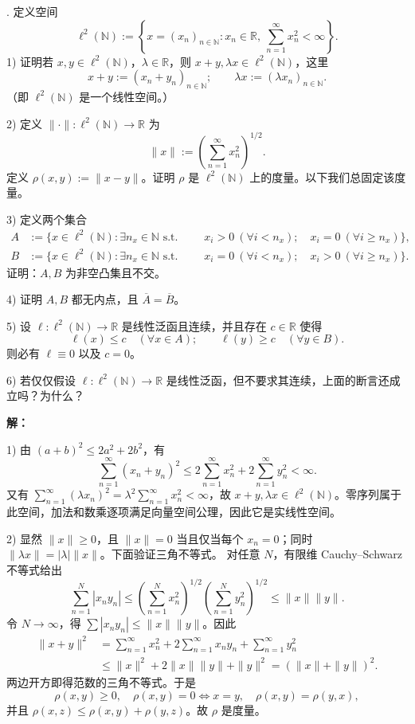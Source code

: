 \documentclass{article}
\begin{document}
\medskip
{}. 定义空间
\[
\ell^2(\mathbb N):=\left\{x=(x_n)_{n\in\mathbb N}:x_n\in\mathbb R,\ \sum_{n=1}^{\infty}x_n^2<\infty\right\}.
\]
1) 证明若 $x,y\in\ell^2(\mathbb N)$，$\lambda\in\mathbb R$，则 $x+y,\lambda x\in\ell^2(\mathbb N)$，这里
\[
x+y:=(x_n+y_n)_{n\in\mathbb N};\qquad
\lambda x:=(\lambda x_n)_{n\in\mathbb N}.
\]
（即 $\ell^2(\mathbb N)$ 是一个线性空间。）

2) 定义 $\|\cdot\|:\ell^2(\mathbb N)\to\mathbb R$ 为
\[
\|x\|:=\left(\sum_{n=1}^{\infty}x_n^2\right)^{1/2}.
\]
定义 $\rho(x,y):=\|x-y\|$。证明 $\rho$ 是 $\ell^2(\mathbb N)$ 上的度量。以下我们总固定该度量。

3) 定义两个集合
\[
\begin{aligned}
A&:=\{x\in\ell^2(\mathbb N):\exists n_x\in\mathbb N\text{ s.t. }\
&\quad x_i>0\ (\forall i<n_x);\quad x_i=0\ (\forall i\ge n_x)\},\\
B&:=\{x\in\ell^2(\mathbb N):\exists n_x\in\mathbb N\text{ s.t. }\
&\quad x_i=0\ (\forall i<n_x);\quad x_i>0\ (\forall i\ge n_x)\}.
\end{aligned}
\]
证明：$A,B$ 为非空凸集且不交。

4) 证明 $A,B$ 都无内点，且 $\overline A=\overline B$。

5) 设 $\ell:\ell^2(\mathbb N)\to\mathbb R$ 是线性泛函且连续，并且存在 $c\in\mathbb R$ 使得
\[
\ell(x)\le c\quad(\forall x\in A);\qquad
\ell(y)\ge c\quad(\forall y\in B).
\]
则必有 $\ell\equiv0$ 以及 $c=0$。

6) 若仅仅假设 $\ell:\ell^2(\mathbb N)\to\mathbb R$ 是线性泛函，但不要求其连续，上面的断言还成立吗？为什么？

\textbf{解：}



1) 由 $(a+b)^2\le2a^2+2b^2$，有
\[
\sum_{n=1}^{\infty}(x_n+y_n)^2
\le2\sum_{n=1}^{\infty}x_n^2+2\sum_{n=1}^{\infty}y_n^2<\infty.
\]
又有 $\sum_{n=1}^{\infty}(\lambda x_n)^2=\lambda^2\sum_{n=1}^{\infty}x_n^2<\infty$，故 $x+y,\lambda x\in\ell^2(\mathbb N)$。零序列属于此空间，加法和数乘逐项满足向量空间公理，因此它是实线性空间。

2) 显然 $\|x\|\ge0$，且 $\|x\|=0$ 当且仅当每个 $x_n=0$；同时 $\|\lambda x\|=|\lambda|\|x\|$。下面验证三角不等式。
对任意 $N$，有限维 Cauchy--Schwarz 不等式给出
\[
\sum_{n=1}^N|x_ny_n|
\le\left(\sum_{n=1}^Nx_n^2\right)^{1/2}
\left(\sum_{n=1}^Ny_n^2\right)^{1/2}
\le\|x\|\|y\|.
\]
令 $N\to\infty$，得 $\sum|x_ny_n|\le\|x\|\|y\|$。因此
\[
\begin{aligned}
\|x+y\|^2
&=\sum_{n=1}^{\infty}x_n^2+2\sum_{n=1}^{\infty}x_ny_n+\sum_{n=1}^{\infty}y_n^2\\
&\le\|x\|^2+2\|x\|\|y\|+\|y\|^2=(\|x\|+\|y\|)^2.
\end{aligned}
\]
两边开方即得范数的三角不等式。于是
\[
\rho(x,y)\ge0,\quad \rho(x,y)=0\iff x=y,\quad
\rho(x,y)=\rho(y,x),
\]
并且 $\rho(x,z)\le\rho(x,y)+\rho(y,z)$。故 $\rho$ 是度量。
\end{document}

